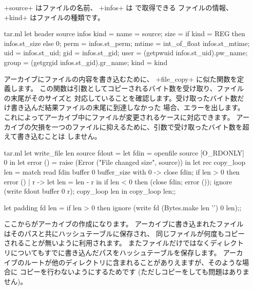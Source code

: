 \begin{answer}
\ml+source+ はファイルの名前、 \ml+infos+ は  で取得できる
ファイルの情報、 \ml+kind+ はファイルの種類です。
%
\begin{listingcodefile}{tar.ml}
let header source infos kind = {
  name = source;
  size = if kind = REG then infos.st_size else 0;
  perm = infos.st_perm;
  mtime = int_of_float infos.st_mtime;
  uid = infos.st_uid;
  gid = infos.st_gid;
  user = (getpwuid infos.st_uid).pw_name;
  group = (getgrgid infos.st_gid).gr_name;
  kind = kind }
\end{listingcodefile}
%
アーカイブにファイルの内容を書き込むために、 \ml+file_copy+ に似た関数を定義します。
この関数は引数としてコピーされるバイト数を受け取り、ファイルの末尾がそのサイズと
対応していることを確認します。受け取ったバイト数だけ書き込んだ結果ファイルの末尾に到達しなかった
場合、エラーを出します。これによってアーカイブ中にファイルが変更されるケースに対応できます。
アーカイブの欠損を一つのファイルに抑えるために、引数で受け取ったバイト数を超えて書き込むことは
しません。
%
\begin{listingcodefile}{tar.ml}
let write_file len source fdout =
  let fdin = openfile source [O_RDONLY] 0 in
  let error () = raise (Error ("File changed size", source)) in
  let rec copy_loop len =
    match read fdin buffer 0 buffer_size with
      0 ->
        close fdin; if len > 0 then error ()
    | r ->
        let len = len - r  in
        if len < 0 then (close fdin; error ());
        ignore (write fdout buffer 0 r); copy_loop len in
  copy_loop len;;

let padding fd len =
  if len > 0 then ignore (write fd (Bytes.make len '') 0 len);;
\end{listingcodefile}
%
ここからがアーカイブの作成になります。
アーカイブに書き込まれたファイルはそのパスと共にハッシュテーブルに保存され、
同じファイルが何度もコピーされることが無いように利用されます。
またファイルだけではなくディレクトリについてもすでに書き込んだパスをハッシュテーブルを保存します。
アーカイブのルートが他のディレクトリに含まれることがありえますが、そのような場合に
コピーを行わないようにするためです (ただしコピーをしても問題はありません)。


\end{answer}
